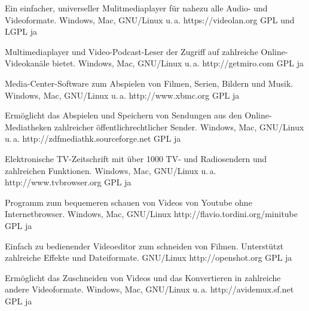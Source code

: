 




{Ein einfacher, universeller Mulitmediaplayer für nahezu alle Audio- und Videoformate.}
{Windows, Mac, GNU/Linux u.\,a.}
{https://videolan.org}
{GPL und LGPL}
{ja}

{Multimediaplayer und Video-Podcast-Leser der Zugriff auf zahlreiche Online-Videokanäle bietet.}
{Windows, Mac, GNU/Linux u.\,a.}
{http://getmiro.com}
{GPL}
{ja}

{Media-Center-Software zum Abspielen von Filmen, Serien, Bildern und Musik.}
{Windows, Mac, GNU/Linux u.\,a.}
{http://www.xbmc.org}
{GPL}
{ja}

{Ermöglicht das Abspielen und Speichern von Sendungen aus den Online-Mediatheken zahlreicher öffentlichrechtlicher Sender.}
{Windows, Mac, GNU/Linux u.\,a.}
{http://zdfmediathk.sourceforge.net}
{GPL}
{ja}


{Elektronische TV-Zeitschrift mit über 1000 TV- und Radiosendern und zahlreichen Funktionen.}
{Windows, Mac, GNU/Linux u.\,a.}
{http://www.tvbrowser.org}
{GPL}
{ja}

{Programm zum bequemeren schauen von Videos von Youtube ohne Internetbrowser.}
{Windows, Mac, GNU/Linux}
{http://flavio.tordini.org/minitube}
{GPL}
{ja}

{Einfach zu bedienender Videoeditor zum schneiden von Filmen. Unterstützt zahlreiche Effekte und Dateiformate.}
{GNU/Linux}
{http://openshot.org}
{GPL}
{ja}

{Ermöglicht das Zuschneiden von Videos und das Konvertieren in zahlreiche andere Videoformate.}
{Windows, Mac, GNU/Linux u.\,a.}
{http://avidemux.sf.net}
{GPL}
{ja}

\backpage

